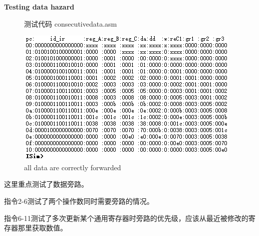\documentclass[10pt,a4paper,fleqn]{article}
\begin{document}
\par {\bf Testing data hazard}
\begin{figure}[H]
  \begin{minipage}{0.28\textwidth}
    测试代码 consecutivedata.asm
    
  \end{minipage}
  \hspace{1em}
  \begin{minipage}{0.65\textwidth}
    \centering
    \includegraphics[width=\textwidth]{figure/simu/datatest.png}
    \caption{all data are correctly forwarded}
  \end{minipage}
\end{figure}

\par 这里重点测试了数据旁路。
\par 指令2-6测试了两个操作数同时需要旁路的情况。
\par 指令6-11测试了多次更新某个通用寄存器时旁路的优先级，应该从最近被修改的寄存器那里获取数值。
\end{document}
